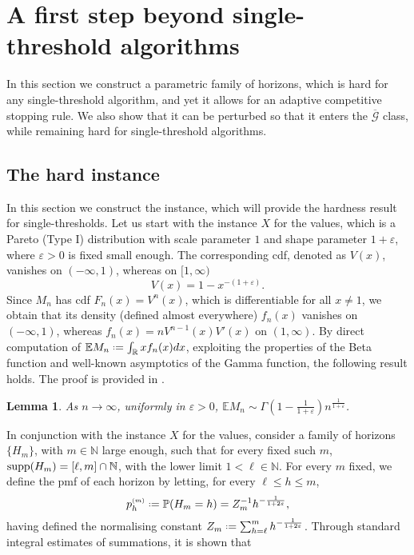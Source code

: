 \documentclass[11pt, a4paper, twoside]{article}
\newcommand*{\defeq}{\mathrel{\vcenter{\baselineskip0.5ex \lineskiplimit0pt
			\hbox{\scriptsize.}\hbox{\scriptsize.}}}=}
\newcommand{\ssup}[1]{{\scriptscriptstyle{({#1})}}}
\newcommand{\eps}{\varepsilon}
\newcommand{\NN}{\mathbb{N}}
\newcommand{\RR}{\mathbb{R}}
\newcommand{\EE}{\mathbb{E}}
\newcommand{\PP}{\mathbb{P}}
\newcommand{\PGFd}{\overline{\mathcal{G}}}
\newtheorem{lemma}{Lemma}[section]
\numberwithin{equation}{section}
\begin{document}
	\section{A first step beyond single-threshold algorithms}\label{hardsecretary}
	In this section we construct a parametric family of horizons, which is hard for any single-threshold algorithm, and yet it allows for an adaptive competitive stopping rule. We also show that it can be perturbed so that it enters the $\PGFd$ class, while remaining hard for single-threshold algorithms.
	
	\subsection{The hard instance}
	In this section we construct the instance, which will provide the hardness result for single-thresholds.
	Let us start with the instance $X$ for the values, which is a Pareto (Type I) distribution with scale parameter $1$ and shape parameter $1+\eps$, where $\eps>0$ is fixed small enough. The corresponding cdf, denoted as $V(x)$, vanishes on $(-\infty,1)$, whereas on $[1,\infty)$
	\begin{equation}\label{hardval}
		V(x)= 1-x^{-(1+\eps)}.
	\end{equation}
	Since $M_n$ has cdf $F_n(x)=V^n(x)$, which is differentiable for all $x\neq 1$, we obtain that its density (defined almost everywhere) $f_n(x)$ vanishes on $(-\infty,1)$, whereas $f_n(x)=nV^{n-1}(x)V'(x)$ on $(1,\infty)$. By direct computation of $\EE M_n \defeq \int_\RR xf_n(x)dx$, exploiting the properties of the Beta function and well-known asymptotics of the Gamma function, the following result holds. The proof is provided in .
	\begin{lemma}\label{asympmax}
		As $n\longrightarrow\infty$, uniformly in $\eps>0$,
		$\EE M_n \sim \Gamma\left(1-\frac{1}{1+\eps}\right)n^{\frac{1}{1+\eps}}$.
	\end{lemma}
In conjunction with the instance $X$ for the values, consider a family of horizons $\{H_m\}$, with $m\in\NN$ large enough, such that for every fixed such $m$, $\supp(H_m)=[\ell,m]\cap\NN$, with the lower limit $1<\ell\in\NN$. For every $m$ fixed, we define the pmf of each horizon by letting, for every $\ell\le h\le m$,
	\begin{equation}\label{hardhorizon}
		p_h^\ssup{m}\defeq \PP(H_m=h)=Z_m^{-1}h^{-\frac{1}{1+2\eps}},
	\end{equation}
	having defined the normalising constant $Z_m\defeq\sum_{h=\ell}^m h^{-\frac{1}{1+2\eps}}$. Through standard integral estimates of summations, it is shown that 
\end{document}
